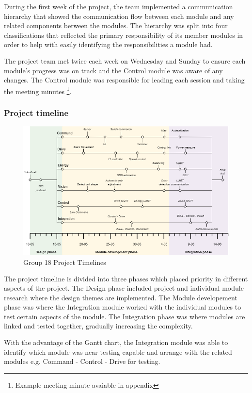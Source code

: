 \documentclass[11pt, a4paper]{article}
\begin{document}
During the first week of the project, the team implemented a communication hierarchy that showed the communication flow between each module and any related components between the modules. The hierarchy was split into four classifications that reflected the primary responsibility of its member modules in order to help with easily identifying the responsibilities a module had. 

The project team met twice each week on Wednesday and Sunday to ensure each module's progress was on track and the Control module was aware of any changes. The Control module was responsible for leading each session and taking the meeting minutes \footnote{Example meeting minute avaiable in appendix}. 
 

\subsubsection{Project timeline}

\begin{figure} [h!]
    \centering
    \includegraphics[scale=0.4]{Timeline.png}
    \caption{Group 18 Project Timelines}
\end{figure}

The project timeline is divided into three phases which placed priority in different aspects of the project. The Design phase included project and individual module research where the design themes are implemented. The Module developement phase was where the Integration module worked with the individual modules to test certain aspects of the module. The Integration phase was where modules are linked and tested together, gradually increasing the complexity.

With the advantage of the Gantt chart, the Integration module was able to identify which module was near testing capable and arrange with the related modules e.g. Command - Control - Drive for testing. 
\end{document}
